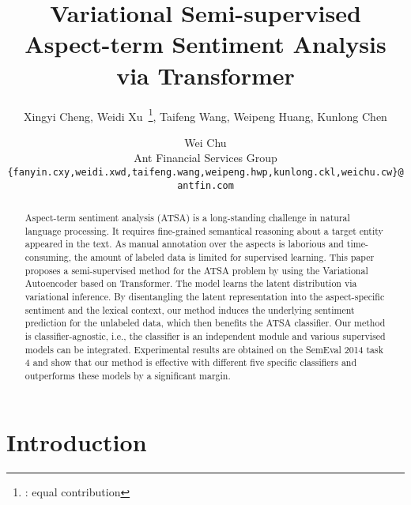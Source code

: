 \documentclass[11pt,a4paper]{article}
\title{Variational Semi-supervised Aspect-term Sentiment Analysis via Transformer}
\author{Xingyi Cheng\thankssymb{1}, Weidi Xu~\thanks{\thankssymb{1}: equal contribution}, Taifeng Wang, Weipeng Huang, Kunlong Chen \and Wei Chu \\
	Ant Financial Services Group \\
{\tt \{fanyin.cxy,weidi.xwd,taifeng.wang,weipeng.hwp,kunlong.ckl,weichu.cw\}@antfin.com}}
\date{}
\begin{document}
\maketitle
\begin{abstract}
	 Aspect-term sentiment analysis (ATSA) is a long-standing challenge in natural language processing. It requires fine-grained semantical reasoning about a target entity appeared in the text.
	 As manual annotation over the aspects is laborious and time-consuming, the amount of labeled data is limited for supervised learning.
	 This paper proposes a semi-supervised method for the ATSA problem by using the Variational Autoencoder based on Transformer. The model learns the latent distribution via variational inference. By disentangling the latent representation into the aspect-specific sentiment and the lexical context, our method induces the underlying sentiment prediction for the unlabeled data, which then benefits the ATSA classifier.
	 Our method is classifier-agnostic, i.e., the classifier is an independent module and various supervised models can be integrated.
	 Experimental results are obtained on the SemEval 2014 task 4 and show that our method is effective with different five specific classifiers and outperforms these models by a significant margin.
 \end{abstract}


\section{Introduction}
\end{document}
